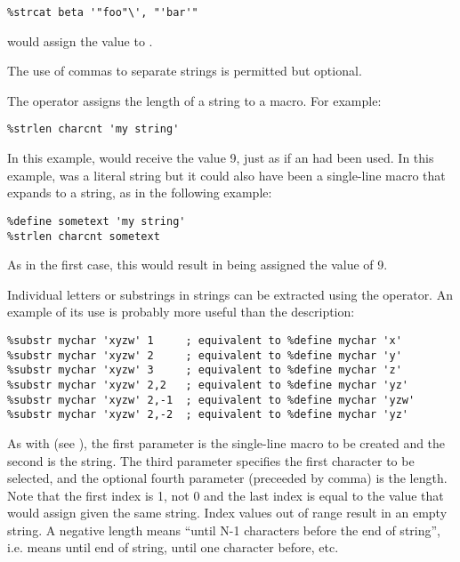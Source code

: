 \begin{lstlisting}
%strcat beta '"foo"\', "'bar'"
\end{lstlisting}

would assign the value 
to .

The use of commas to separate strings is permitted but optional.


The  operator assigns the length of a string to a macro.
For example:

\begin{lstlisting}
%strlen charcnt 'my string'
\end{lstlisting}

In this example,  would receive the value 9, just as
if an  had been used. In this example, 
was a literal string but it could also have been a single-line
macro that expands to a string, as in the following example:

\begin{lstlisting}
%define sometext 'my string'
%strlen charcnt sometext
\end{lstlisting}

As in the first case, this would result in  being
assigned the value of 9.


Individual letters or substrings in strings can be extracted using the
 operator. An example of its use is probably more useful
than the description:

\begin{lstlisting}
%substr mychar 'xyzw' 1     ; equivalent to %define mychar 'x'
%substr mychar 'xyzw' 2     ; equivalent to %define mychar 'y'
%substr mychar 'xyzw' 3     ; equivalent to %define mychar 'z'
%substr mychar 'xyzw' 2,2   ; equivalent to %define mychar 'yz'
%substr mychar 'xyzw' 2,-1  ; equivalent to %define mychar 'yzw'
%substr mychar 'xyzw' 2,-2  ; equivalent to %define mychar 'yz'
\end{lstlisting}

As with  (see ), the first
parameter is the single-line macro to be created and the second
is the string. The third parameter specifies the first character
to be selected, and the optional fourth parameter (preceeded by comma)
is the length. Note that the first index is 1, not 0 and the last
index is equal to the value that  would assign given
the same string. Index values out of range result in an empty string.
A negative length means ``until N-1 characters before the end of string'',
i.e.  means until end of string,  until one character
before, etc.


